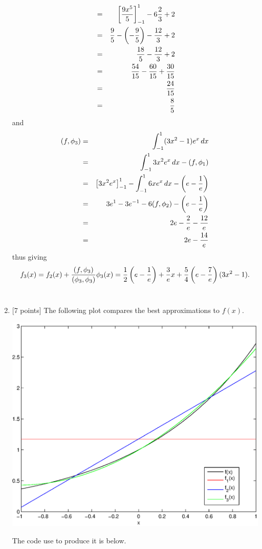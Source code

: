 \begin{solution}
\begin{enumerate}
\begin{eqnarray*}
 &=& \left[{9x^5\over 5}\right]_{-1}^1-6{2\over 3} +2
\\
 &=& {9\over 5}-\left(-{9\over 5}\right)-{12\over 3} +2
\\
 &=& {18\over 5}-{12\over 3} +2
\\
 &=& {54\over 15}-{60\over 15} +{30\over 15}
\\
 &=& {24\over 15}
\\
 &=& {8\over 5}
\end{eqnarray*}
and
\begin{eqnarray*}
(f,\phi_3) &=& \int_{-1}^1 (3x^2-1)e^x\,dx
\\
&=& \int_{-1}^1 3x^2e^x\,dx-(f,\phi_1)
\\
 &=& \left[3x^2e^x\right]_{-1}^1-\int_{-1}^1 6xe^x\,dx-\left(e-{1\over e}\right)
\\
 &=& 3e^1-3e^{-1}-6(f,\phi_2)-\left(e-{1\over e}\right)
\\
 &=& 2e-{2\over e}-{12\over e}
\\
 &=& 2e-{14\over e}
\end{eqnarray*}
thus giving
       \[ f_3(x) = f_2(x) + {(f,\phi_3) \over (\phi_3, \phi_3)} \phi_3(x) = {1\over 2}\left(e-{1\over e}\right)
                  + {3\over e}x + {5\over 4} \left(e-{7\over e}\right) (3x^2-1) .\]
\\
\item {[7 points]} The following plot compares the best approximations to $f(x)$.

\begin{center} \includegraphics[scale=0.5]{hw16d} \end{center}

The code use to produce it is below.


\end{enumerate}
\end{solution}

